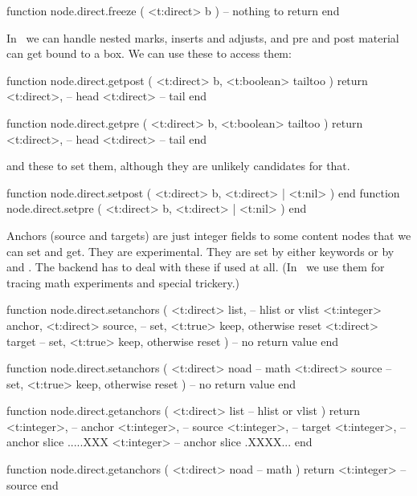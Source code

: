 \starttyping[option=LUA]
function node.direct.freeze ( <t:direct> b )
    -- nothing to return
end
\stoptyping

In \LUAMETATEX\ we can handle nested marks, inserts and adjusts, and
pre and post material can get bound to a box. We can use these to access them:

\starttyping[option=LUA]
function node.direct.getpost ( <t:direct> b, <t:boolean> tailtoo )
    return
        <t:direct>, -- head
        <t:direct>  -- tail
end

function node.direct.getpre ( <t:direct> b, <t:boolean> tailtoo )
    return
        <t:direct>, -- head
        <t:direct>  -- tail
end
\stoptyping

and these to set them, although they are unlikely candidates for that.

\starttyping[option=LUA]
function node.direct.setpost ( <t:direct> b, <t:direct> | <t:nil> ) end
function node.direct.setpre  ( <t:direct> b, <t:direct> | <t:nil> ) end
\stoptyping

Anchors (source and targets) are just integer fields to some content nodes that
we can set and get. They are experimental. They are set by either keywords or by
 and . The backend has to deal with these if
used at all. (In \CONTEXT\ we use them for tracing math experiments and special
trickery.)

\starttyping[option=LUA]
function node.direct.setanchors (
    <t:direct>  list,   -- hlist or vlist
    <t:integer> anchor,
    <t:direct>  source, -- set, <t:true> keep, otherwise reset
    <t:direct>  target  -- set, <t:true> keep, otherwise reset
)
    -- no return value
end

function node.direct.setanchors (
    <t:direct> noad -- math
    <t:direct> source -- set, <t:true> keep, otherwise reset
)
    -- no return value
end
\stoptyping

\starttyping[option=LUA]
function node.direct.getanchors (
    <t:direct> list  -- hlist or vlist
)
    return
        <t:integer>, -- anchor
        <t:integer>, -- source
        <t:integer>, -- target
        <t:integer>, -- anchor slice .....XXX
        <t:integer>  -- anchor slice .XXXX...
end

function node.direct.getanchors (
    <t:direct> noad -- math
)
    return
        <t:integer> -- source
end
\stoptyping

\stopsubsection

\startsubsection[title={Paragraphs}]

